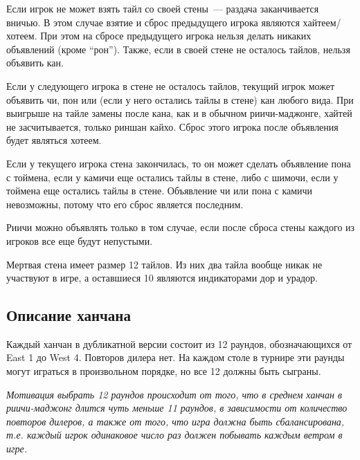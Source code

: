 \begin{additional}
\vspace{0.3cm}

Если игрок не может взять тайл со своей стены~--- раздача заканчивается вничью. В этом случае взятие и сброс предыдущего игрока являются хайтеем/хотеем. При этом на сбросе предыдущего игрока нельзя делать никаких объявлений (кроме ``рон''). Также, если в своей стене не осталось тайлов, нельзя объявить кан.

\vspace{0.3cm}

Если у следующего игрока в стене не осталось тайлов, текущий игрок может объявить чи, пон или (если у него остались тайлы в стене) кан любого вида. При выигрыше на тайле замены после кана, как и в обычном риичи-маджонге, хайтей не засчитывается, только риншан кайхо. Сброс этого игрока после объявления будет являться хотеем.

\vspace{0.3cm}

Если у текущего игрока стена закончилась, то он может сделать объявление пона с тоймена, если у камичи еще остались тайлы в стене, либо с шимочи, если у тоймена еще остались тайлы в стене. Объявление чи или пона с камичи невозможны, потому что его сброс является последним.

\vspace{0.3cm}

Риичи можно объявлять только в том случае, если после сброса стены каждого из игроков все еще будут непустыми.

\vspace{0.3cm}

Мертвая стена имеет размер 12 тайлов. Из них два тайла вообще никак не участвуют в игре, а оставшиеся 10 являются индикаторами дор и урадор.

\subsection{Описание ханчана}

Каждый ханчан в дубликатной версии состоит из 12 раундов, обозначающихся от East 1 до West 4. Повторов дилера нет. На каждом столе в турнире эти раунды могут играться в произвольном порядке, но все 12 должны быть сыграны.

\vspace{0.3cm}

\textit{Мотивация выбрать 12 раундов происходит от того, что в среднем ханчан в риичи-маджонг длится чуть меньше 11 раундов, в зависимости от количество повторов дилеров, а также от того, что игра должна быть сбалансирована, т.е. каждый игрок одинаковое число раз должен побывать каждым ветром в игре.}


\end{additional}
